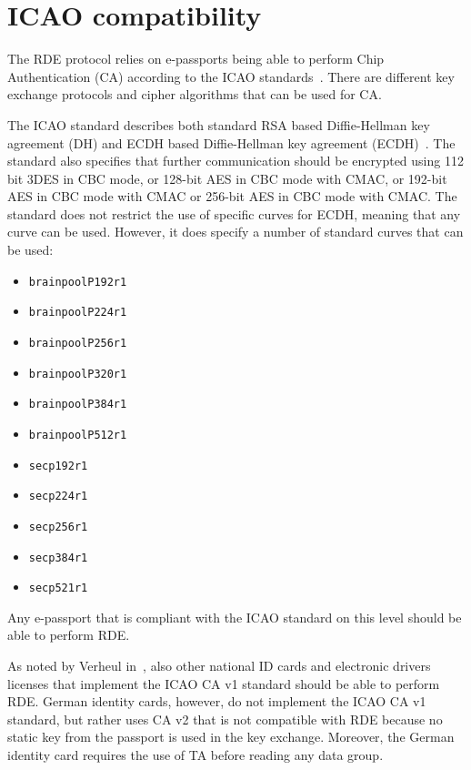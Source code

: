\section{ICAO compatibility}\label{sec:icao-compatibility}
The RDE protocol relies on e-passports being able to perform Chip Authentication (CA) according to the ICAO standards~\cite{icao9303securitymechanisms}.
There are different key exchange protocols and cipher algorithms that can be used for CA.

The ICAO standard describes both standard RSA based Diffie-Hellman key agreement (DH) and ECDH based Diffie-Hellman key agreement (ECDH)~\cite{icao9303securitymechanisms}.
The standard also specifies that further communication should be encrypted using 112 bit 3DES in CBC mode, or 128-bit AES in CBC mode with CMAC, or 192-bit AES in CBC mode with CMAC or 256-bit AES in CBC mode with CMAC.
The standard does not restrict the use of specific curves for ECDH, meaning that any curve can be used.
However, it does specify a number of standard curves that can be used:
\begin{itemize}
    \item \texttt{brainpoolP192r1}
    \item \texttt{brainpoolP224r1}
    \item \texttt{brainpoolP256r1}
    \item \texttt{brainpoolP320r1}
    \item \texttt{brainpoolP384r1}
    \item \texttt{brainpoolP512r1}
    \item \texttt{secp192r1}
    \item \texttt{secp224r1}
    \item \texttt{secp256r1}
    \item \texttt{secp384r1}
    \item \texttt{secp521r1}
\end{itemize}
Any e-passport that is compliant with the ICAO standard on this level should be able to perform RDE.

As noted by Verheul in~\cite{verheul2017remote}, also other national ID cards and electronic drivers licenses that implement the ICAO CA v1 standard should be able to perform RDE.
German identity cards, however, do not implement the ICAO CA v1 standard, but rather uses CA v2 that is not compatible with RDE because no static key from the passport is used in the key exchange.
Moreover, the German identity card requires the use of TA before reading any data group.

